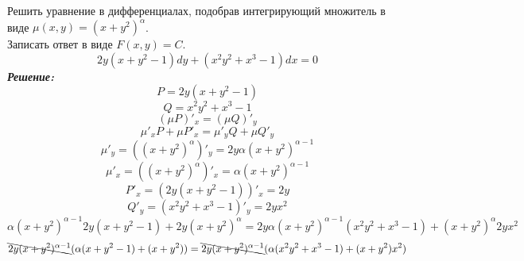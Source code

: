 \documentclass[a5paper, 10pt]{article}
\theoremstyle{definition}
\theoremstyle{plain}
\theoremstyle{remark}
\begin{document}

\newpage
\section{}
Решить уравнение в дифференциалах, подобрав интегрирующий множитель в виде $\mu (x, y) = (x+y^2)^{\alpha}$.\\
Записать ответ в виде $F(x, y) = C$.
\begin{equation*}
2y(x + y^2 - 1) dy + (x^2y^2+x^3 - 1)dx = 0
\end{equation*}
\textit{\textbf{Решение:}}\\
\begin{equation*}
P = 2y(x + y^2 - 1) 
\end{equation*}
\begin{equation*}
Q = x^2y^2+x^3 - 1
\end{equation*}
\begin{equation*}
\left( \mu P \right)'_x = \left( \mu Q \right)'_y
\end{equation*}
\begin{equation*}
 \mu'_x P + \mu P'_x = \mu'_y Q  +  \mu Q'_y
\end{equation*}
\begin{equation*}
 \mu'_y =  \left(  (x+y^2)^{\alpha} \right)'_y  = 2y{\alpha} (x+y^2)^{\alpha - 1}
\end{equation*}
\begin{equation*}
 \mu'_x =  \left(  (x+y^2)^{\alpha} \right)'_x  = {\alpha} (x+y^2)^{\alpha - 1}
\end{equation*}
\begin{equation*}
 P'_x =  \left(  2y(x + y^2 - 1)  \right)'_x = 2y
\end{equation*}
\begin{equation*}
 Q'_y=  \left(  x^2y^2+x^3 - 1  \right)'_y = 2yx^2
\end{equation*}
\begin{equation*}
  {\alpha} (x+y^2)^{\alpha - 1}  2y(x + y^2 - 1) + 2y(x+y^2)^{\alpha}  = 2y{\alpha} (x+y^2)^{\alpha - 1} ( x^2y^2+x^3 - 1)  +  (x+y^2)^{\alpha}  2yx^2
\end{equation*}
\begin{equation*}
 \bcancel{ 2y (x+y^2)^{\alpha - 1}} ( {\alpha}(x + y^2 - 1) +(x+y^2)) =  \bcancel{ 2y (x+y^2)^{\alpha - 1}}({\alpha} ( x^2y^2+x^3 - 1)  +  (x+y^2)x^2)
\end{equation*}
\end{document}
